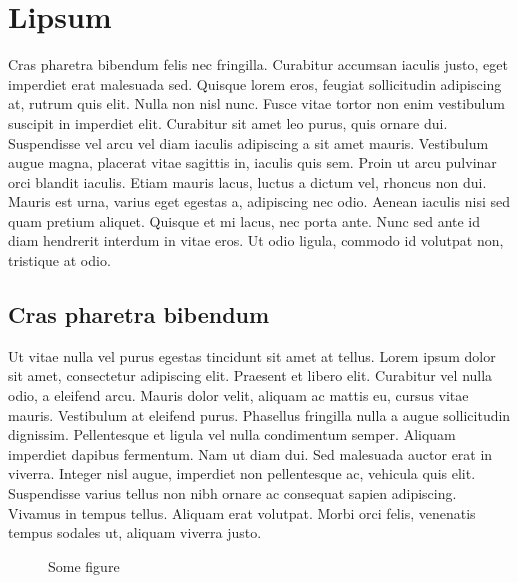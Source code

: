 \chapter{Lipsum}
\label{section:lipsum}

Cras pharetra bibendum felis nec fringilla. Curabitur accumsan iaculis justo, eget imperdiet erat malesuada sed. Quisque lorem eros, feugiat sollicitudin adipiscing at, rutrum quis elit. Nulla non nisl nunc. Fusce vitae tortor non enim vestibulum suscipit in imperdiet elit. Curabitur sit amet leo purus, quis ornare dui. Suspendisse vel arcu vel diam iaculis adipiscing a sit amet mauris. Vestibulum augue magna, placerat vitae sagittis in, iaculis quis sem. Proin ut arcu pulvinar orci blandit iaculis. Etiam mauris lacus, luctus a dictum vel, rhoncus non dui. Mauris est urna, varius eget egestas a, adipiscing nec odio. Aenean iaculis nisi sed quam pretium aliquet. Quisque et mi lacus, nec porta ante. Nunc sed ante id diam hendrerit interdum in vitae eros. Ut odio ligula, commodo id volutpat non, tristique at odio.

\section{Cras pharetra bibendum}
\label{section:lipsum:cras}

Ut vitae nulla vel purus egestas tincidunt sit amet at tellus. Lorem ipsum dolor sit amet, consectetur adipiscing elit. Praesent et libero elit. Curabitur vel nulla odio, a eleifend arcu. Mauris dolor velit, aliquam ac mattis eu, cursus vitae mauris. Vestibulum at eleifend purus. Phasellus fringilla nulla a augue sollicitudin dignissim. Pellentesque et ligula vel nulla condimentum semper. Aliquam imperdiet dapibus fermentum. Nam ut diam dui. Sed malesuada auctor erat in viverra. Integer nisl augue, imperdiet non pellentesque ac, vehicula quis elit. Suspendisse varius tellus non nibh ornare ac consequat sapien adipiscing. Vivamus in tempus tellus. Aliquam erat volutpat. Morbi orci felis, venenatis tempus sodales ut, aliquam viverra justo.~\cite{conference:06,Doe:2010}

\begin{figure}[ht]
	\centering
	\subfloat[Something]{
		\resizebox{0.45\linewidth}{!}{
			\label{figure:some1}
			
		}
	}
	\hfill
	\caption{Some figure}
	\label{figure:some}
\end{figure}

